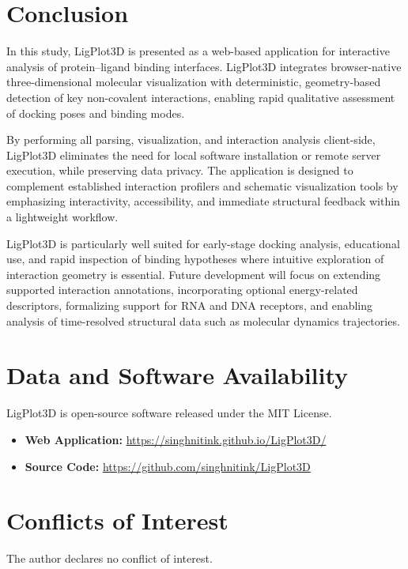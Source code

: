 \documentclass[lettersize,journal]{IEEEtran}
\begin{document}
\section{Conclusion}
In this study, LigPlot3D is presented as a web-based application for interactive analysis of protein--ligand binding interfaces. LigPlot3D integrates browser-native three-dimensional molecular visualization with deterministic, geometry-based detection of key non-covalent interactions, enabling rapid qualitative assessment of docking poses and binding modes.

By performing all parsing, visualization, and interaction analysis client-side, LigPlot3D eliminates the need for local software installation or remote server execution, while preserving data privacy. The application is designed to complement established interaction profilers and schematic visualization tools by emphasizing interactivity, accessibility, and immediate structural feedback within a lightweight workflow.

LigPlot3D is particularly well suited for early-stage docking analysis, educational use, and rapid inspection of binding hypotheses where intuitive exploration of interaction geometry is essential. Future development will focus on extending supported interaction annotations, incorporating optional energy-related descriptors, formalizing support for RNA and DNA receptors, and enabling analysis of time-resolved structural data such as molecular dynamics trajectories.

\section*{Data and Software Availability}
LigPlot3D is open-source software released under the MIT License.
\begin{itemize}
    \item \textbf{Web Application:} \href{https://singhnitink.github.io/LigPlot3D/}{https://singhnitink.github.io/LigPlot3D/}
    \item \textbf{Source Code:} \href{https://github.com/singhnitink/LigPlot3D}{https://github.com/singhnitink/LigPlot3D}
\end{itemize}

\section*{Conflicts of Interest}
The author declares no conflict of interest.



\end{document}
